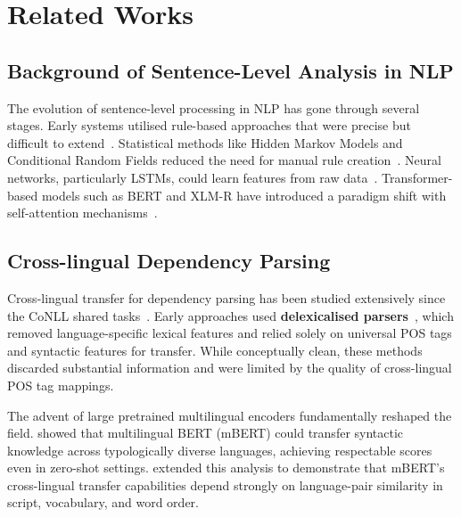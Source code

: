 \documentclass[12pt,a4paper,oneside]{report}
\begin{document}
\chapter{Related Works}
\label{chap:related}

\section{Background of Sentence-Level Analysis in NLP}

The evolution of sentence-level processing in NLP has gone through several stages.
Early systems utilised rule-based approaches that were precise but difficult to
extend~\citep{winograd1972}. Statistical methods like Hidden Markov Models and
Conditional Random Fields reduced the need for manual rule
creation~\citep{lafferty2001crf}. Neural networks, particularly LSTMs, could learn
features from raw data~\citep{hochreiter1997lstm}. Transformer-based models such as
BERT and XLM-R have introduced a paradigm shift with self-attention
mechanisms~\citep{vaswani2017attention,devlin2019bert,conneau2020xlmr}.

\section{Cross-lingual Dependency Parsing}

Cross-lingual transfer for dependency parsing has been studied extensively since
the CoNLL shared tasks~\citep{zeman2017conll,zeman2018conll}. Early approaches used
\textbf{delexicalised parsers}~\citep{mcdonald2011multi}, which removed
language-specific lexical features and relied solely on universal POS tags and
syntactic features for transfer. While conceptually clean, these methods discarded
substantial information and were limited by the quality of cross-lingual POS tag
mappings.

The advent of large pretrained multilingual encoders fundamentally reshaped the
field. \citet{schuster2019cross} showed that multilingual BERT (mBERT) could
transfer syntactic knowledge across typologically diverse languages, achieving
respectable scores even in zero-shot settings. \citet{wu2019beto} extended this
analysis to demonstrate that mBERT's cross-lingual transfer capabilities depend
strongly on language-pair similarity in script, vocabulary, and word order.
\end{document}
